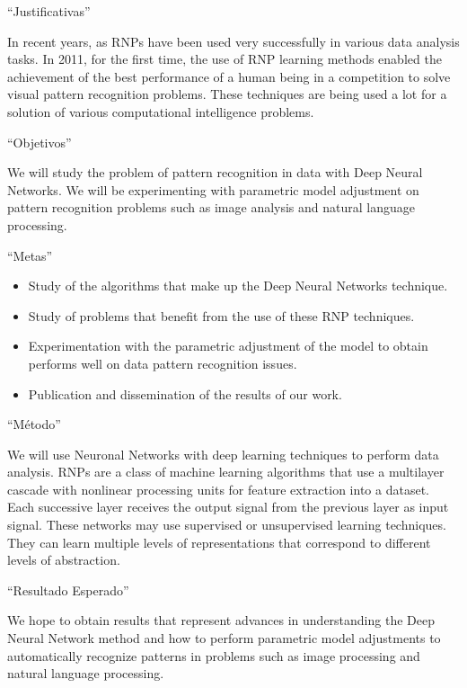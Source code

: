 ``Justificativas''

In recent years, as RNPs have been used very successfully in various data analysis
tasks. In 2011, for the first time, the use of RNP learning methods enabled the achievement
of the best performance of a human being in a competition to solve visual pattern
recognition problems. These techniques are being used a lot for a solution of various
computational intelligence problems.


``Objetivos''

We will study the problem of pattern recognition in data with Deep Neural Networks.
We will be experimenting with parametric model adjustment on pattern recognition problems
such as image analysis and natural language processing.


``Metas''

\begin{itemize}
  \item Study of the algorithms that make up the Deep Neural Networks technique.
  \item Study of problems that benefit from the use of these RNP techniques.
  \item Experimentation with the parametric adjustment of the model to obtain 
  performs well on data pattern recognition issues.
  \item Publication and dissemination of the results of our work.
\end{itemize}


``M\'{e}todo''

We will use Neuronal Networks with deep learning techniques to perform data analysis.
RNPs are a class of machine learning algorithms that use a multilayer cascade with
nonlinear processing units for feature extraction into a dataset. Each successive
layer receives the output signal from the previous layer as input signal. These networks
may use supervised or unsupervised learning techniques. They can learn multiple
levels of representations that correspond to different levels of abstraction.


``Resultado Esperado''

We hope to obtain results that represent advances in understanding the Deep Neural
Network method and how to perform parametric model adjustments to automatically
recognize patterns in problems such as image processing and natural language processing.
